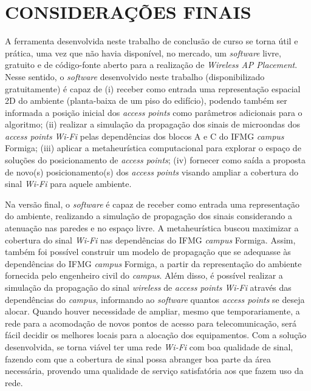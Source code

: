 \documentclass[
	12pt,				%
	twoside,			%
	a4paper,			%
	english,			%
	french,				%
	spanish,			%
	brazil				%
	]{abntex2}
\begin{document}
\chapter{CONSIDERAÇÕES FINAIS}\label{sec:consideracoes}

A ferramenta desenvolvida neste trabalho de conclusão de curso se torna
útil e prática, uma vez que não havia disponível, no mercado, um
\emph{software} livre, gratuito e de código-fonte aberto para a
realização de \emph{Wireless AP Placement}. Nesse sentido, o
\emph{software} desenvolvido neste trabalho (disponibilizado
gratuitamente) é capaz de (i) receber como entrada uma representação
espacial 2D do ambiente (planta-baixa de um piso do edifício), podendo
também ser informada a posição inicial dos \emph{access points} como
parâmetros adicionais para o algoritmo; (ii) realizar a simulação da
propagação dos sinais de microondas dos \emph{access points}
\emph{Wi-Fi} pelas dependências dos blocos A e C do IFMG \emph{campus}
Formiga; (iii) aplicar a metaheurística computacional para explorar o
espaço de soluções do posicionamento de \emph{access points}; (iv)
fornecer como saída a proposta de novo(s) posicionamento(s) dos
\emph{access points} visando ampliar a cobertura do sinal \emph{Wi-Fi}
para aquele ambiente.

Na versão final, o \emph{software} é capaz de receber como entrada uma
representação do ambiente, realizando a simulação de propagação dos
sinais considerando a atenuação nas paredes e no espaço livre. A
metaheurística buscou maximizar a cobertura do sinal \emph{Wi-Fi} nas
dependências do IFMG \emph{campus} Formiga. Assim, também foi possível
construir um modelo de propagação que se adequasse às dependências do
IFMG \emph{campus} Formiga, a partir da representação do ambiente
fornecida pelo engenheiro civil do \emph{campus}. Além disso, é possível
realizar a simulação da propagação do sinal \emph{wireless} de
\emph{access points} \emph{Wi-Fi} através das dependências do
\emph{campus}, informando ao \emph{software} quantos \emph{access
points} se deseja alocar. Quando houver necessidade de ampliar, mesmo
que temporariamente, a rede para a acomodação de novos pontos de acesso
para telecomunicação, será fácil decidir os melhores locais para a
alocação dos equipamentos. Com a solução desenvolvida, se torna viável
ter uma rede \emph{Wi-Fi} com boa qualidade de sinal, fazendo com que a
cobertura de sinal possa abranger boa parte da área necessária, provendo
uma qualidade de serviço satisfatória aos que fazem uso da rede.
\end{document}
